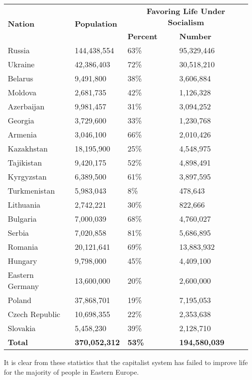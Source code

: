 \begin{center}
\begin{tabular}{|l|l|l|l|}
\hline
\multirow{2}{*}{\textbf{Nation}} & \multirow{2}{*}{\textbf{Population}} & \multicolumn{2}{|c|}{\textbf{Favoring Life Under Socialism}} \\\cline{3-4}
& & \textbf{Percent} & \textbf{Number} \\\hline
Russia & 144,438,554 & 63\% & 95,329,446 \\\hline
Ukraine & 42,386,403 & 72\% & 30,518,210 \\\hline
Belarus & 9,491,800 & 38\% & 3,606,884 \\\hline
Moldova & 2,681,735 & 42\% & 1,126,328 \\\hline
Azerbaijan & 9,981,457 & 31\% & 3,094,252 \\\hline
Georgia & 3,729,600 & 33\% & 1,230,768 \\\hline
Armenia & 3,046,100 & 66\% & 2,010,426 \\\hline
Kazakhstan & 18,195,900 & 25\% & 4,548,975 \\\hline
Tajikistan & 9,420,175 & 52\% & 4,898,491 \\\hline
Kyrgyzstan & 6,389,500 & 61\% & 3,897,595 \\\hline
Turkmenistan & 5,983,043 & 8\% & 478,643 \\\hline
Lithuania & 2,742,221 & 30\% & 822,666 \\\hline
Bulgaria & 7,000,039 & 68\% & 4,760,027 \\\hline
Serbia & 7,020,858 & 81\% & 5,686,895 \\\hline
Romania & 20,121,641 & 69\% & 13,883,932 \\\hline
Hungary & 9,798,000 & 45\% & 4,409,100 \\\hline
Eastern Germany & 13,600,000 & 20\% & 2,600,000 \\\hline
Poland & 37,868,701 & 19\% & 7,195,053 \\\hline
Czech Republic & 10,698,355 & 22\% & 2,353,638 \\\hline
Slovakia & 5,458,230 & 39\% & 2,128,710 \\\hline
\textbf{Total} & \textbf{370,052,312} & \textbf{53\%} & \textbf{194,580,039} \\\hline
\end{tabular}
\end{center}

It is clear from these statistics that the capitalist system has failed to improve life for the majority of people in Eastern Europe.

